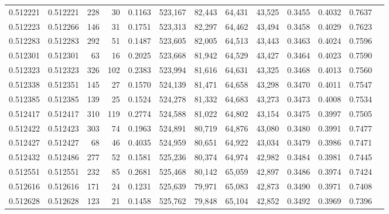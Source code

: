 \begin{tabular}{rrrrrrrrrrrrr}
0.512221 & 0.512221 &   228 &    30 &                                     0.1163 & 523,167 &  82,443 &  64,431 &  43,525 & 0.3455 & 0.4032 & 0.7637 \\
0.512223 & 0.512266 &   146 &    31 &                                     0.1751 & 523,313 &  82,297 &  64,462 &  43,494 & 0.3458 & 0.4029 & 0.7623 \\
0.512283 & 0.512283 &   292 &    51 &                                     0.1487 & 523,605 &  82,005 &  64,513 &  43,443 & 0.3463 & 0.4024 & 0.7596 \\
0.512301 & 0.512301 &    63 &    16 &                                     0.2025 & 523,668 &  81,942 &  64,529 &  43,427 & 0.3464 & 0.4023 & 0.7590 \\
0.512323 & 0.512323 &   326 &   102 &                                     0.2383 & 523,994 &  81,616 &  64,631 &  43,325 & 0.3468 & 0.4013 & 0.7560 \\
0.512338 & 0.512351 &   145 &    27 &                                     0.1570 & 524,139 &  81,471 &  64,658 &  43,298 & 0.3470 & 0.4011 & 0.7547 \\
0.512385 & 0.512385 &   139 &    25 &                                     0.1524 & 524,278 &  81,332 &  64,683 &  43,273 & 0.3473 & 0.4008 & 0.7534 \\
0.512417 & 0.512417 &   310 &   119 &                                     0.2774 & 524,588 &  81,022 &  64,802 &  43,154 & 0.3475 & 0.3997 & 0.7505 \\
0.512422 & 0.512423 &   303 &    74 &                                     0.1963 & 524,891 &  80,719 &  64,876 &  43,080 & 0.3480 & 0.3991 & 0.7477 \\
0.512427 & 0.512427 &    68 &    46 &                                     0.4035 & 524,959 &  80,651 &  64,922 &  43,034 & 0.3479 & 0.3986 & 0.7471 \\
0.512432 & 0.512486 &   277 &    52 &                                     0.1581 & 525,236 &  80,374 &  64,974 &  42,982 & 0.3484 & 0.3981 & 0.7445 \\
0.512551 & 0.512551 &   232 &    85 &                                     0.2681 & 525,468 &  80,142 &  65,059 &  42,897 & 0.3486 & 0.3974 & 0.7424 \\
0.512616 & 0.512616 &   171 &    24 &                                     0.1231 & 525,639 &  79,971 &  65,083 &  42,873 & 0.3490 & 0.3971 & 0.7408 \\
0.512628 & 0.512628 &   123 &    21 &                                     0.1458 & 525,762 &  79,848 &  65,104 &  42,852 & 0.3492 & 0.3969 & 0.7396 \\

\end{tabular}
